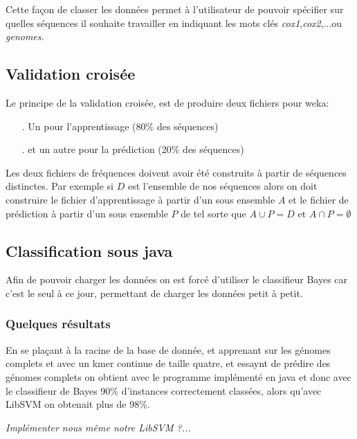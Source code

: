 Cette façon de classer les données permet à l'utilisateur de pouvoir spécifier sur quelles séquences il souhaite travailler en indiquant les mots clés \textit{cox1},\textit{cox2},...ou \textit{genomes}.

\subsection{Validation croisée}

Le principe de la validation croisée, est de produire deux fichiers pour weka:
\begin{itemize}
  \item[.] Un pour l'apprentissage (80\% des séquences)
  \item[.] et un autre pour la prédiction (20\% des séquences)
\end{itemize}

Les deux fichiers de fréquences doivent avoir été construits à partir de séquences distinctes. Par exemple si $D$ est l'ensemble de nos séquences alors
on doit construire le fichier d'apprentissage à partir d'un sous ensemble $A$ et le fichier de prédiction à partir d'un sous ensemble $P$ de 
tel sorte que $A \cup P = D $ et  $ A \cap P = \emptyset $  

\subsection{Classification sous java}

Afin de pouvoir charger les données on est forcé d'utiliser le classifieur Bayes car c'est le seul à ce jour, 
permettant de charger les données petit à petit. 

\subsubsection{Quelques résultats}
En se plaçant à la racine de la base de donnée, et apprenant sur les génomes complets et avec un kmer continue de taille quatre, et essaynt de prédire des génomes complets on obtient avec le programme implémenté en java et donc avec le classifieur de Bayes 90\% d'instances correctement classées, alors qu'avec LibSVM on obtenait plus de 98\%. 


{\scriptsize \textit{Implémenter nous même notre LibSVM ?...}}
